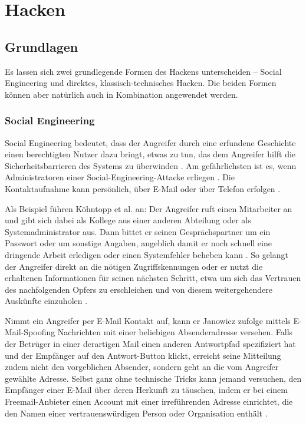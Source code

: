 \section{Hacken}
\subsection{Grundlagen}

Es lassen sich zwei grundlegende Formen des Hackens unterscheiden -- Social Engineering und direktes, klassisch-technisches Hacken. Die beiden Formen können aber natürlich auch in Kombination angewendet werden.

\subsubsection{Social Engineering}

Social Engineering bedeutet, dass der Angreifer durch eine erfundene Geschichte einen berechtigten Nutzer dazu bringt, etwas zu tun, das dem Angreifer hilft die Sicherheitsbarrieren des Systems zu überwinden \cite[S.~77]{Pip00}. Am gefährlichsten ist es, wenn Administratoren einer Social-Engineering-Attacke erliegen \cite[S.~94]{Rae01}. Die Kontaktaufnahme kann persönlich, über E-Mail oder über Telefon erfolgen \cite[S.~119]{Sta95}.

Als Beispiel führen Köhntopp et al. an: Der Angreifer ruft einen Mitarbeiter an und gibt sich dabei als Kollege aus einer anderen Abteilung oder als Systemadministrator aus. Dann bittet er seinen Gesprächspartner um ein Passwort oder um sonstige Angaben, angeblich damit er noch schnell eine dringende Arbeit erledigen oder einen Systemfehler beheben kann \cite[S.~15]{KSG98}. So gelangt der Angreifer direkt an die nötigen Zugriffskennungen oder er nutzt die erhaltenen Informationen für seinen nächsten Schritt, etwa um sich das Vertrauen des nachfolgenden Opfers zu erschleichen und von diesem weitergehendere Auskünfte einzuholen \cite[S.~260]{ScB01}.

Nimmt ein Angreifer per E-Mail Kontakt auf, kann er Janowicz zufolge \zB{} mittels E-Mail-Spoofing Nachrichten mit einer beliebigen Absenderadresse versehen. Falls der Betrüger in einer derartigen Mail einen anderen Antwortpfad spezifiziert hat und der Empfänger auf den Antwort-Button klickt, erreicht seine Mitteilung zudem nicht den vorgeblichen Absender, sondern geht an die vom Angreifer gewählte Adresse. Selbst ganz ohne technische Tricks kann jemand versuchen, den Empfänger einer E-Mail über deren Herkunft zu täuschen, indem er bei einem Freemail-Anbieter einen Account mit einer irreführenden Adresse einrichtet, die den Namen einer vertrauenswürdigen Person oder Organisation enthält \cite[S.~109--110, 123]{Jan02}.

